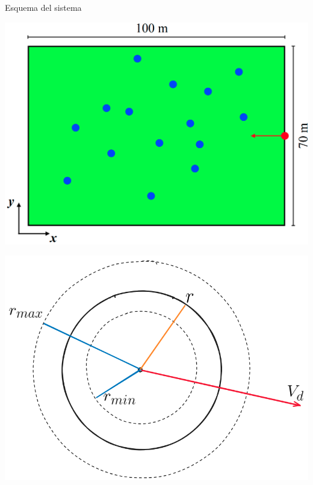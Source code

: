 \begin{frame}{Esquema del sistema}
    \begin{center}
        \begin{minipage}{0.65\textwidth}
            \includegraphics[width=\textwidth]{pic/04-simulaciones/esquema-field}
        \end{minipage}
        \hfill
        \begin{minipage}{0.3\textwidth}
            \includegraphics[width=\textwidth]{pic/04-simulaciones/esquema-particula}
        \end{minipage}
    \end{center}
\end{frame}

